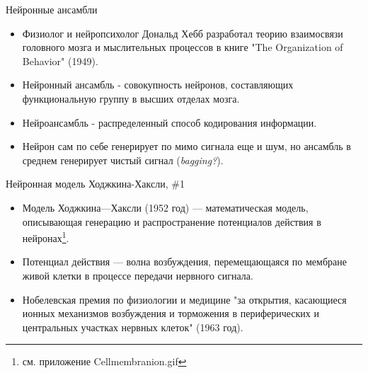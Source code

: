 \documentclass[10pt]{beamer}
\begin{document}
\begin{frame}{Нейронные ансамбли}

\begin{itemize}
	\item Физиолог и нейропсихолог Дональд Хебб разработал теорию взаимосвязи головного мозга и мыслительных процессов в книге "The Organization of Behavior" (1949).
	\item Нейронный ансамбль - совокупность нейронов, составляющих функциональную группу в высших отделах мозга.
	\item Нейроансамбль - распределенный способ кодирования информации.
	\item Нейрон сам по себе генерирует по мимо сигнала еще и шум, но ансамбль в среднем генерирует чистый сигнал (\textit{bagging?}).
\end{itemize}


\end{frame}


\begin{frame}{Нейронная модель Ходжкина-Хаксли, \#1}

\begin{itemize}
	\item Модель Ходжкина—Хаксли (1952 год) — математическая модель, описывающая генерацию и распространение потенциалов действия в нейронах\footnote{см. приложение Cellmembranion.gif}.
	\item Потенциал действия — волна возбуждения, перемещающаяся по мембране живой клетки в процессе передачи нервного сигнала.
	\item Нобелевская премия по физиологии и медицине "за открытия, касающиеся ионных механизмов возбуждения и торможения в периферических и центральных участках нервных клеток" (1963 год). 
\end{itemize}


\end{frame}
\end{document}
